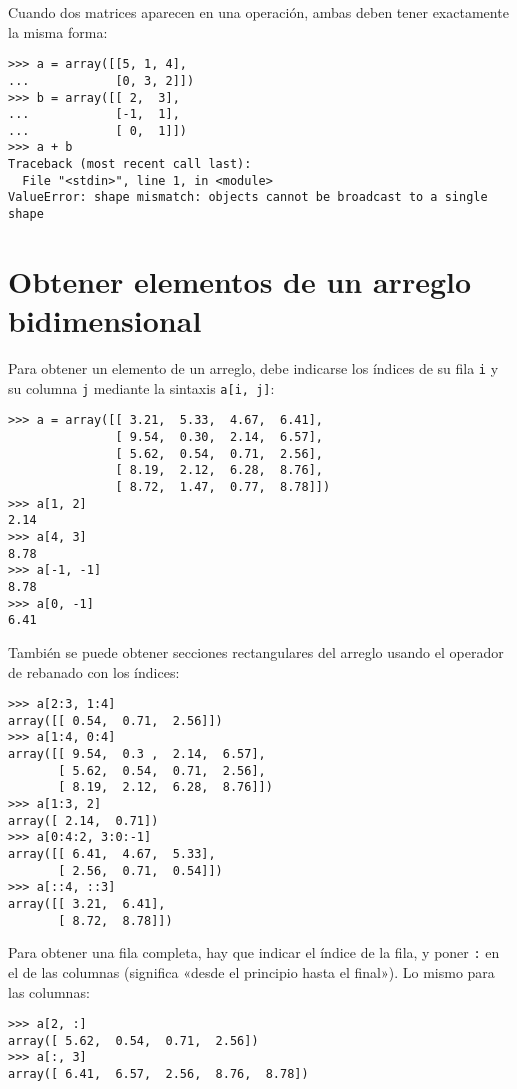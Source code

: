 Cuando dos matrices aparecen en una operación, ambas deben tener
exactamente la misma forma:

\begin{lstlisting}
>>> a = array([[5, 1, 4],
...            [0, 3, 2]])
>>> b = array([[ 2,  3],
...            [-1,  1],
...            [ 0,  1]])
>>> a + b
Traceback (most recent call last):
  File "<stdin>", line 1, in <module>
ValueError: shape mismatch: objects cannot be broadcast to a single shape
\end{lstlisting}

\section{Obtener elementos de un arreglo bidimensional}

Para obtener un elemento de un arreglo, debe indicarse los índices de su
fila \lstinline!i! y su columna \lstinline!j! mediante la sintaxis
\lstinline!a[i, j]!:

\begin{lstlisting}
>>> a = array([[ 3.21,  5.33,  4.67,  6.41],
               [ 9.54,  0.30,  2.14,  6.57],
               [ 5.62,  0.54,  0.71,  2.56],
               [ 8.19,  2.12,  6.28,  8.76],
               [ 8.72,  1.47,  0.77,  8.78]])
>>> a[1, 2]
2.14
>>> a[4, 3]
8.78
>>> a[-1, -1]
8.78
>>> a[0, -1]
6.41
\end{lstlisting}

También se puede obtener secciones rectangulares del arreglo usando el
operador de rebanado con los índices:

\begin{lstlisting}
>>> a[2:3, 1:4]
array([[ 0.54,  0.71,  2.56]])
>>> a[1:4, 0:4]
array([[ 9.54,  0.3 ,  2.14,  6.57],
       [ 5.62,  0.54,  0.71,  2.56],
       [ 8.19,  2.12,  6.28,  8.76]])
>>> a[1:3, 2]
array([ 2.14,  0.71])
>>> a[0:4:2, 3:0:-1]
array([[ 6.41,  4.67,  5.33],
       [ 2.56,  0.71,  0.54]])
>>> a[::4, ::3]
array([[ 3.21,  6.41],
       [ 8.72,  8.78]])
\end{lstlisting}

Para obtener una fila completa, hay que indicar el índice de la fila, y
poner \lstinline!:! en el de las columnas (significa «desde el principio
hasta el final»). Lo mismo para las columnas:

\begin{lstlisting}
>>> a[2, :]
array([ 5.62,  0.54,  0.71,  2.56])
>>> a[:, 3]
array([ 6.41,  6.57,  2.56,  8.76,  8.78])
\end{lstlisting}

